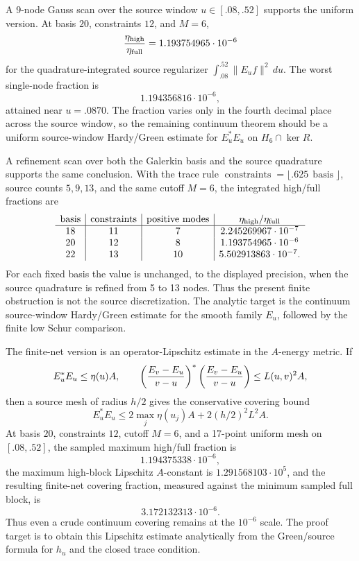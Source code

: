 \documentclass[11pt]{article}
\begin{document}
A 9-node Gauss scan over the source window \(u\in[.08,.52]\) supports the
uniform version.  At basis \(20\), constraints \(12\), and \(M=6\),
\[
  \frac{\eta_{\rm high}}{\eta_{\rm full}}
  =1.193754965\cdot10^{-6}
\]
for the quadrature-integrated source regularizer
\(\int_{.08}^{.52}\|E_u f\|^2\,du\).  The worst single-node fraction is
\[
  1.194356816\cdot10^{-6},
\]
attained near \(u=.0870\).  The fraction varies only in the fourth decimal
place across the source window, so the remaining continuum theorem should be a
uniform source-window Hardy/Green estimate for \(E_u^\ast E_u\) on
\(H_6\cap\ker R\).

A refinement scan over both the Galerkin basis and the source quadrature
supports the same conclusion.  With the trace rule
\(\operatorname{constraints}=\lfloor .625\,\operatorname{basis}\rfloor\),
source counts \(5,9,13\), and the same cutoff \(M=6\), the integrated
high/full fractions are
\[
\begin{array}{c|c|c|c}
\operatorname{basis} & \operatorname{constraints} &
\operatorname{positive\ modes} &
\eta_{\rm high}/\eta_{\rm full} \\\hline
18 & 11 & 7  & 2.245269967\cdot 10^{-7}\\
20 & 12 & 8  & 1.193754965\cdot 10^{-6}\\
22 & 13 & 10 & 5.502913863\cdot 10^{-7}.
\end{array}
\]
For each fixed basis the value is unchanged, to the displayed precision, when
the source quadrature is refined from 5 to 13 nodes.  Thus the present finite
obstruction is not the source discretization.  The analytic target is the
continuum source-window Hardy/Green estimate for the smooth family \(E_u\),
followed by the finite low Schur comparison.

The finite-net version is an operator-Lipschitz estimate in the \(A\)-energy
metric.  If
\[
  E_u^\ast E_u\le \eta(u)A,\qquad
  \left({E_v-E_u\over v-u}\right)^\ast
  \left({E_v-E_u\over v-u}\right)\le L(u,v)^2 A,
\]
then a source mesh of radius \(h/2\) gives the conservative covering bound
\[
  E_u^\ast E_u
  \le 2\max_j \eta(u_j)A+2(h/2)^2 L^2 A .
\]
At basis \(20\), constraints \(12\), cutoff \(M=6\), and a 17-point uniform
mesh on \([.08,.52]\), the sampled maximum high/full fraction is
\[
  1.194375338\cdot10^{-6},
\]
the maximum high-block Lipschitz \(A\)-constant is \(1.291568103\cdot10^5\),
and the resulting finite-net covering fraction, measured against the minimum
sampled full block, is
\[
  3.172132313\cdot10^{-6}.
\]
Thus even a crude continuum covering remains at the \(10^{-6}\) scale.  The
proof target is to obtain this Lipschitz estimate analytically from the
Green/source formula for \(h_u\) and the closed trace condition.
\end{document}
